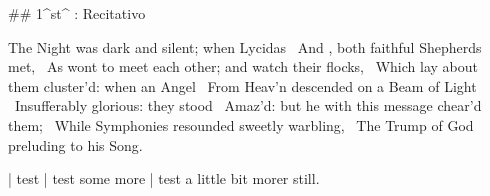 \newpage
{}

## 1^st^ \mvmt: Recitativo

\begin{minipage}
\beginnumbering
\pstart
The Night was dark and silent; when Lycidas  \
And , both faithful Shepherds met,  \
As wont to meet each other; and watch their flocks,  \
Which lay about them cluster’d: when an Angel  \
From Heav’n descended on a Beam of Light  \
Insufferably glorious: they stood  \
Amaz’d: but he with this message chear’d them;  \
While Symphonies resounded sweetly warbling,  \
The Trump of God preluding to his Song.
\pend
\endnumbering
\end{minipage}

| test
| test some more
| test a little bit morer still.

